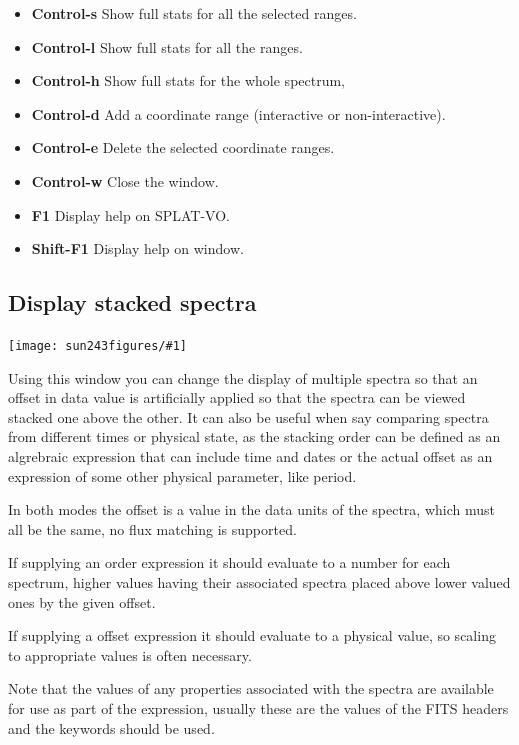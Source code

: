 \documentclass[twoside,11pt]{article}
\newcommand{\htmladdimg}[1]{}
\newcommand{\latexhtml}[2]{#1}
\renewcommand{\_}{\texttt{\symbol{95}}}
\newcommand{\SPLAT}{\textsf{SPLAT-VO}}
\newcommand{\mainfigure}[1]
{\begin{center}
 \latexhtml{\texttt{[image: sun243\_figures/\#1]}}{\htmladdimg{#1.gif}}
 \end{center}
}
\newcommand{\labelitem}[1]{\textbf{#1}}
\begin{document}
\begin{itemize}
\item \labelitem{Control-s} Show full stats for all the selected ranges.
\item \labelitem{Control-l} Show full stats for all the ranges.
\item \labelitem{Control-h} Show full stats for the whole spectrum,

\item \labelitem{Control-d} Add a coordinate range (interactive or non-interactive).
\item \labelitem{Control-e} Delete the selected coordinate ranges.

\item \labelitem{Control-w} Close the window.
\item \labelitem{F1} Display help on \SPLAT.
\item \labelitem{Shift-F1} Display help on window.
\end{itemize}

\newpage
\subsection{Display stacked spectra}

\mainfigure{stackerwindow}

Using this window you can change the display of multiple spectra so that an
offset in data value is artificially applied so that the spectra can be viewed
stacked one above the other. It can also be useful when say comparing spectra
from different times or physical state, as the stacking order can be defined
as an algrebraic expression that can include time and dates or the actual
offset as an expression of some other physical parameter, like period.

In both modes the offset is a value in the data units of the spectra, which
must all be the same, no flux matching is supported.

If supplying an order expression it should evaluate to a number for each
spectrum, higher values having their associated spectra placed above lower
valued ones by the given offset.

If supplying a offset expression it should evaluate to a physical value, so
scaling to appropriate values is often necessary.

Note that the values of any properties associated with the spectra are
available for use as part of the expression, usually these are the values of
the FITS headers and the keywords should be used.
\end{document}
